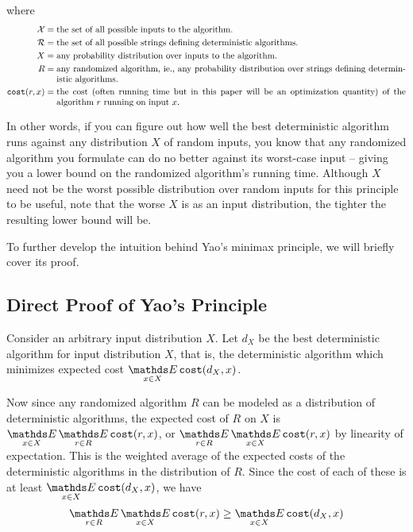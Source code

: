 where \begin{align*}
\mathcal{X} =&\; \text{the set of all possible inputs to the algorithm.}
\\
\mathcal{R} =&\; \text{the set of all possible strings defining deterministic algorithms.}
\\
X =&\; \text{any probability distribution over inputs to the algorithm.}
\\
R =&\; \text{\parbox[t]{5.5in}{any randomized algorithm, ie., any probability distribution over strings defining deterministic algorithms.}}
\\
\texttt{cost}(r, x) =&\; \text{\parbox[t]{5.5in}{the cost (often running time but in this paper will be an optimization quantity) of the algorithm $r$ running on input $x$.}}
\end{align*}

In other words, if you can figure out how well the best deterministic algorithm runs against any distribution $X$ of random inputs, you know that any randomized algorithm you formulate can do no better against its worst-case input -- giving you a lower bound on the randomized algorithm's running time.
Although $X$ need not be the worst possible distribution over random inputs for this principle to be useful, note that the worse $X$ is as an input distribution, the tighter the resulting lower bound will be. 

To further develop the intuition behind Yao's minimax principle, we will briefly cover its proof.

\subsection{Direct Proof of Yao's Principle}

Consider an arbitrary input distribution $X$. Let $d_X$ be the best deterministic algorithm for input distribution $X$, that is, the deterministic algorithm which minimizes expected cost $\Expected_{x\in X}\texttt{cost}(d_X,x)$.

Now since any randomized algorithm $R$ can be modeled as a distribution of deterministic algorithms, the expected cost of $R$ on $X$ is $\Expected_{x\in X}\Expected_{r\in R}\texttt{cost}(r,x)$, or $\Expected_{r\in R}\Expected_{x\in X}\texttt{cost}(r,x)$ by linearity of expectation. This is the weighted average of the expected costs of the deterministic algorithms in the distribution of $R$. Since the cost of each of these is at least $\Expected_{x\in X}\texttt{cost}(d_X,x)$, we have
\[\Expected_{r\in R}\Expected_{x\in X}\texttt{cost}(r,x) \ge \Expected_{x\in X}\texttt{cost}(d_X,x)\]

